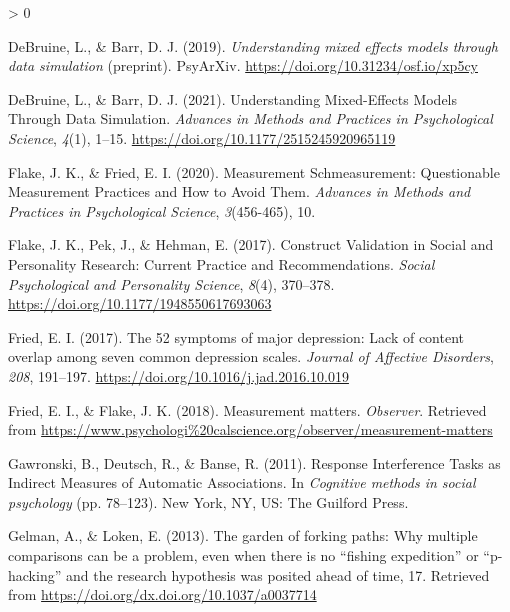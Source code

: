 \documentclass[
  english,
  man,floatsintext]{apa6}
\newlength{\cslhangindent}
\newenvironment{CSLReferences}[2] %
 {%
  \setlength{\parindent}{0pt}
  \ifodd #1 \everypar{\setlength{\hangindent}{\cslhangindent}}\ignorespaces\fi
  \ifnum #2 > 0
  \setlength{\parskip}{#2\baselineskip}
  \fi
 }%
 {}
\begin{document}
\begin{CSLReferences}{1}{0}
\leavevmode\hypertarget{ref-debruine_understanding_2019}{}%
DeBruine, L., \& Barr, D. J. (2019). \emph{Understanding mixed effects models through data simulation} (preprint). PsyArXiv. \url{https://doi.org/10.31234/osf.io/xp5cy}

\leavevmode\hypertarget{ref-debruine_understanding_2021}{}%
DeBruine, L., \& Barr, D. J. (2021). Understanding {Mixed}-{Effects} {Models} {Through} {Data} {Simulation}. \emph{Advances in Methods and Practices in Psychological Science}, \emph{4}(1), 1--15. \url{https://doi.org/10.1177/2515245920965119}

\leavevmode\hypertarget{ref-flake_measurement_2020}{}%
Flake, J. K., \& Fried, E. I. (2020). Measurement {Schmeasurement}: {Questionable} {Measurement} {Practices} and {How} to {Avoid} {Them}. \emph{Advances in Methods and Practices in Psychological Science}, \emph{3}(456-465), 10.

\leavevmode\hypertarget{ref-flake_construct_2017}{}%
Flake, J. K., Pek, J., \& Hehman, E. (2017). Construct {Validation} in {Social} and {Personality} {Research}: {Current} {Practice} and {Recommendations}. \emph{Social Psychological and Personality Science}, \emph{8}(4), 370--378. \url{https://doi.org/10.1177/1948550617693063}

\leavevmode\hypertarget{ref-fried_52_2017}{}%
Fried, E. I. (2017). The 52 symptoms of major depression: {Lack} of content overlap among seven common depression scales. \emph{Journal of Affective Disorders}, \emph{208}, 191--197. \url{https://doi.org/10.1016/j.jad.2016.10.019}

\leavevmode\hypertarget{ref-fried_measurement_2018}{}%
Fried, E. I., \& Flake, J. K. (2018). Measurement matters. \emph{Observer}. Retrieved from \url{https://www.psychologi\%20calscience.org/observer/measurement-matters}

\leavevmode\hypertarget{ref-gawronski_response_2011-1}{}%
Gawronski, B., Deutsch, R., \& Banse, R. (2011). Response {Interference} {Tasks} as {Indirect} {Measures} of {Automatic} {Associations}. In \emph{Cognitive methods in social psychology} (pp. 78--123). New York, NY, US: The Guilford Press.

\leavevmode\hypertarget{ref-gelman_garden_2013}{}%
Gelman, A., \& Loken, E. (2013). The garden of forking paths: {Why} multiple comparisons can be a problem, even when there is no {``ﬁshing expedition''} or {``p-hacking''} and the research hypothesis was posited ahead of time, 17. Retrieved from \url{https://doi.org/dx.doi.org/10.1037/a0037714}


\end{CSLReferences}
\end{document}
